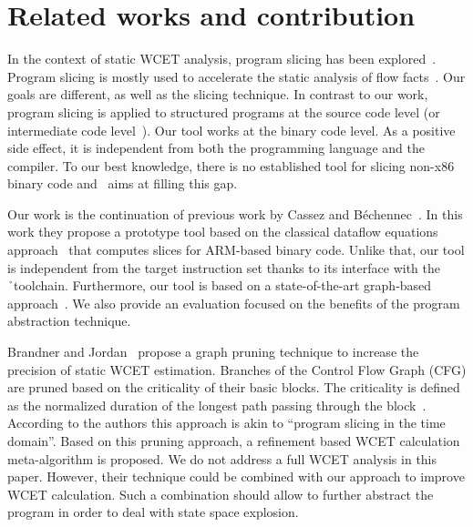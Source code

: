\section{Related works and contribution}
\label{sec:relatedworks}

  In the context of static WCET analysis, program slicing has been
  explored~\cite{Sandberg2006,Lokuciejewski2009,CB13}. Program slicing is mostly
  used to accelerate the static analysis of flow
  facts~\cite{Sandberg2006,Lokuciejewski2009}. Our goals are different, as well
  as the slicing technique. In contrast to our work, program slicing is applied
  to structured programs at the source code level (or intermediate code
  level~\cite{Sandberg2006}). Our tool works at the binary code level. As a
  positive side effect, it is independent from both the programming language and
  the compiler. To our best knowledge, there is no established tool for slicing
  non-x86 binary code and \best\ aims at filling this gap.

  Our work is the continuation of previous work by Cassez and
  Béchennec~\cite{CB13}. In this work they propose a prototype tool based on the
  classical dataflow equations approach~\cite{Wei81} that computes slices for
  ARM-based binary code. Unlike that, our tool is independent from the target
  instruction set thanks to its interface with the \h\ toolchain. Furthermore,
  our tool is based on a state-of-the-art graph-based approach~\cite{KJL03}. We
  also provide an evaluation focused on the benefits of the program abstraction
  technique.

  Brandner and Jordan~\cite{Brandner2014} propose a graph pruning technique to
  increase the precision of static WCET estimation. Branches of the Control Flow
  Graph (CFG) are pruned based on the criticality of their basic blocks. The
  criticality is defined as the normalized duration of the longest path passing
  through the block~\cite{Brandner2012}. According to the authors this approach
  is akin to ``program slicing in the time domain''. Based on this pruning
  approach, a refinement based WCET calculation meta-algorithm is proposed. We
  do not address a full WCET analysis in this paper. However, their technique
  could be combined with our approach to improve WCET calculation. Such a
  combination should allow to further abstract the program in order to deal with
  state space explosion.






